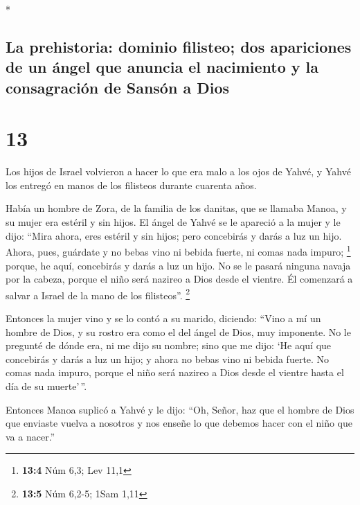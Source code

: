 \begin{paracol}{2}
\begin{otherlanguage}{english}
\end{otherlanguage}

\switchcolumn[0]*

\hypertarget{la-prehistoria-dominio-filisteo-dos-apariciones-de-un-uxe1ngel-que-anuncia-el-nacimiento-y-la-consagraciuxf3n-de-sansuxf3n-a-dios}{%
\subsection{La prehistoria: dominio filisteo; dos apariciones de un
ángel que anuncia el nacimiento y la consagración de Sansón a
Dios}\label{la-prehistoria-dominio-filisteo-dos-apariciones-de-un-uxe1ngel-que-anuncia-el-nacimiento-y-la-consagraciuxf3n-de-sansuxf3n-a-dios}}

\hypertarget{section-24}{%
\section{13}\label{section-24}}

 Los hijos de Israel volvieron a hacer lo que era malo a
los ojos de Yahvé, y Yahvé los entregó en manos de los filisteos durante
cuarenta años.

 Había un hombre de Zora, de la familia de los danitas,
que se llamaba Manoa, y su mujer era estéril y sin hijos. 
El ángel de Yahvé se le apareció a la mujer y le dijo: ``Mira ahora,
eres estéril y sin hijos; pero concebirás y darás a luz un hijo.
 Ahora, pues, guárdate y no bebas vino ni bebida fuerte,
ni comas nada impuro; \footnote{\textbf{13:4} Núm 6,3; Lev 11,1}
 porque, he aquí, concebirás y darás a luz un hijo. No se
le pasará ninguna navaja por la cabeza, porque el niño será nazireo a
Dios desde el vientre. Él comenzará a salvar a Israel de la mano de los
filisteos''. \footnote{\textbf{13:5} Núm 6,2-5; 1Sam 1,11}

 Entonces la mujer vino y se lo contó a su marido,
diciendo: ``Vino a mí un hombre de Dios, y su rostro era como el del
ángel de Dios, muy imponente. No le pregunté de dónde era, ni me dijo su
nombre;  sino que me dijo: `He aquí que concebirás y darás
a luz un hijo; y ahora no bebas vino ni bebida fuerte. No comas nada
impuro, porque el niño será nazireo a Dios desde el vientre hasta el día
de su muerte'\,''.

 Entonces Manoa suplicó a Yahvé y le dijo: ``Oh, Señor,
haz que el hombre de Dios que enviaste vuelva a nosotros y nos enseñe lo
que debemos hacer con el niño que va a nacer.''


\end{paracol}

